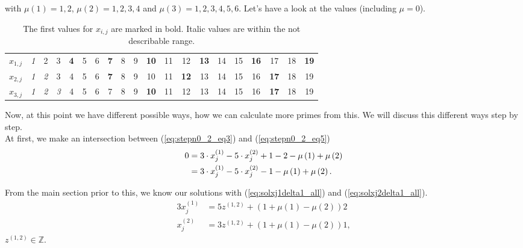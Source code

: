 with $\mu\left(1\right) = 1,2$, $\mu\left(2\right) = 1,2,3,4$ and $\mu\left(3\right) = 1,2,3,4,5,6$. Let's have a look at the values (including $\mu = 0$).

\begin{table}[H]
\centering
\caption{The first values for $x_{i,j}$ are marked in bold. Italic values are within the not describable range.}
\begin{tabular}{c|ccccccccccccccccccc}
\hline	$x_{1,j}$ & \textit{1} & 2 & 3 & \textbf{4} & 5 & 6 & \textbf{7} & 8 & 9 & \textbf{10} & 11 & 12 & \textbf{13} & 14 & 15 & \textbf{16} & 17 & 18 & \textbf{19} \\
	$x_{2,j}$ & \textit{1} & \textit{2} & 3 & 4 & 5 & 6 & \textbf{7} & 8 & 9 & 10 & 11 & \textbf{12} & 13 & 14 & 15 & 16 & \textbf{17} & 18 & 19 \\
	$x_{3,j}$ & \textit{1} & \textit{2} & \textit{3} & 4 & 5 & 6 & 7 & 8 & 9 & \textbf{10} & 11 & 12 & 13 & 14 & 15 & 16 & \textbf{17} & 18 & 19
\end{tabular}
\label{tab:stepn0_2_values357}
\end{table}

Now, at this point we have different possible ways, how we can calculate more primes from this. We will discuss this different ways step by step.\\
At first, we make an intersection between (\ref{eq:stepn0_2_eq3}) and (\ref{eq:stepn0_2_eq5})
\begin{alignat}{3}
	0 &= 3\cdot x_{j}^{\left(1\right)} - 5\cdot x_{j}^{\left(2\right)} + 1 - 2 - \mu\left(1\right)  + \mu\left(2\right) \notag \\
	  &= 3\cdot x_{j}^{\left(1\right)} - 5\cdot x_{j}^{\left(2\right)} -1 - \mu\left(1\right)  + \mu\left(2\right). \label{eq:step0_2_int35}
\end{alignat}

From the main section prior to this, we know our solutions with (\ref{eq:solxj1delta1_all}) and (\ref{eq:solxj2delta1_all}).
\begin{alignat}{3}
	x_{j}^{\left(1\right)} &= 5z^{\left(1,2\right)} + \left(1 + \mu\left(1\right) - \mu\left(2\right)\right)2 \label{eq:step0_2_sol35_1} \\
	x_{j}^{\left(2\right)} &= 3z^{\left(1,2\right)} + \left(1 + \mu\left(1\right) - \mu\left(2\right)\right)1 \label{eq:step0_2_sol35_2},
\end{alignat}
$z^{\left(1,2\right)} \in \mathbb{Z}$.














